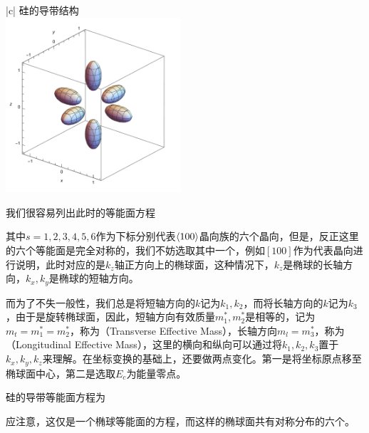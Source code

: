 \begin{TableLong}[硅的导带结构]{|c|}
    硅的导带结构\\
    \hlinelig
    \includegraphics[width=6.5cm]{Mathematica/output/eqE_C.pdf}\\
\end{TableLong}\vspace{0.25cm}
我们很容易列出此时的等能面方程
其中$s=1,2,3,4,5,6$作为下标分别代表$\<1 0 0>$晶向族的六个晶向，但是，反正这里的六个等能面是完全对称的，我们不妨选取其中一个，例如$[1 0 0]$作为代表晶向进行说明，此时对应的是$k_z$轴正方向上的椭球面，这种情况下，$k_z$是椭球的长轴方向，$k_x,k_y$是椭球的短轴方向。\goodbreak

而为了不失一般性，我们总是将短轴方向的$k$记为$k_1,k_2$，而将长轴方向的$k$记为$k_3$，由于是旋转椭球面，因此，短轴方向有效质量$m_1^{*},m_2^{*}$是相等的，记为$m_t=m_1^{*}=m_2^{*}$，称为（Transverse Effective Mass），长轴方向$m_l=m_3^{*}$，称为（Longitudinal Effective Mass），这里的横向和纵向可以通过将$k_1,k_2,k_3$置于$k_x,k_y,k_z$来理解。在坐标变换的基础上，还要做两点变化。第一是将坐标原点移至椭球面中心，第二是选取$E_c$为能量零点。

\begin{BoxFormula}[硅的导带等能面]
    硅的导带等能面方程为
    应注意，这仅是一个椭球等能面的方程，而这样的椭球面共有对称分布的六个。
\end{BoxFormula}

